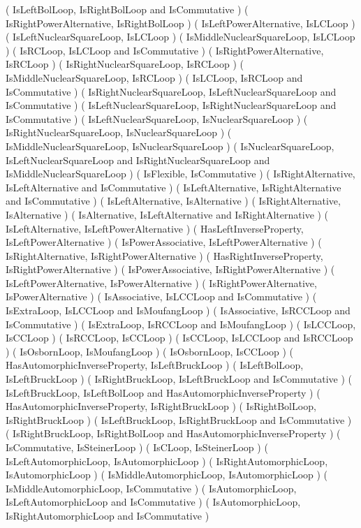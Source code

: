 ( IsLeftBolLoop, IsRightBolLoop and IsCommutative )
( IsRightPowerAlternative, IsRightBolLoop )
( IsLeftPowerAlternative, IsLCLoop )
( IsLeftNuclearSquareLoop, IsLCLoop )
( IsMiddleNuclearSquareLoop, IsLCLoop )
( IsRCLoop, IsLCLoop and IsCommutative )
( IsRightPowerAlternative, IsRCLoop )
( IsRightNuclearSquareLoop, IsRCLoop )
( IsMiddleNuclearSquareLoop, IsRCLoop )
( IsLCLoop, IsRCLoop and IsCommutative )
( IsRightNuclearSquareLoop, IsLeftNuclearSquareLoop and IsCommutative )
( IsLeftNuclearSquareLoop, IsRightNuclearSquareLoop and IsCommutative )
( IsLeftNuclearSquareLoop, IsNuclearSquareLoop )
( IsRightNuclearSquareLoop, IsNuclearSquareLoop )
( IsMiddleNuclearSquareLoop, IsNuclearSquareLoop )
( IsNuclearSquareLoop, IsLeftNuclearSquareLoop
    and IsRightNuclearSquareLoop and IsMiddleNuclearSquareLoop )
( IsFlexible, IsCommutative )
( IsRightAlternative, IsLeftAlternative and IsCommutative )
( IsLeftAlternative, IsRightAlternative and IsCommutative )
( IsLeftAlternative, IsAlternative )
( IsRightAlternative, IsAlternative )
( IsAlternative, IsLeftAlternative and IsRightAlternative )
( IsLeftAlternative, IsLeftPowerAlternative )
( HasLeftInverseProperty, IsLeftPowerAlternative )
( IsPowerAssociative, IsLeftPowerAlternative )
( IsRightAlternative, IsRightPowerAlternative )
( HasRightInverseProperty, IsRightPowerAlternative )
( IsPowerAssociative, IsRightPowerAlternative )
( IsLeftPowerAlternative, IsPowerAlternative )
( IsRightPowerAlternative, IsPowerAlternative )
( IsAssociative, IsLCCLoop and IsCommutative )
( IsExtraLoop, IsLCCLoop and IsMoufangLoop )
( IsAssociative, IsRCCLoop and IsCommutative )
( IsExtraLoop, IsRCCLoop and IsMoufangLoop )
( IsLCCLoop, IsCCLoop )
( IsRCCLoop, IsCCLoop )
( IsCCLoop, IsLCCLoop and IsRCCLoop )
( IsOsbornLoop, IsMoufangLoop )
( IsOsbornLoop, IsCCLoop )
( HasAutomorphicInverseProperty, IsLeftBruckLoop )
( IsLeftBolLoop, IsLeftBruckLoop )
( IsRightBruckLoop, IsLeftBruckLoop and IsCommutative )
( IsLeftBruckLoop, IsLeftBolLoop and HasAutomorphicInverseProperty )
( HasAutomorphicInverseProperty, IsRightBruckLoop )
( IsRightBolLoop, IsRightBruckLoop )
( IsLeftBruckLoop, IsRightBruckLoop and IsCommutative )
( IsRightBruckLoop, IsRightBolLoop and HasAutomorphicInverseProperty )
( IsCommutative, IsSteinerLoop )
( IsCLoop, IsSteinerLoop )
( IsLeftAutomorphicLoop, IsAutomorphicLoop )
( IsRightAutomorphicLoop, IsAutomorphicLoop )
( IsMiddleAutomorphicLoop, IsAutomorphicLoop )
( IsMiddleAutomorphicLoop, IsCommutative )
( IsAutomorphicLoop, IsLeftAutomorphicLoop and IsCommutative )
( IsAutomorphicLoop, IsRightAutomorphicLoop and IsCommutative )

